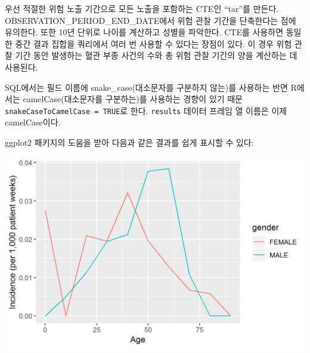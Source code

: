 \documentclass[10.5pt]{book}
\newenvironment{Shaded}{\begin{snugshade}}{\end{snugshade}}
\newcommand{\KeywordTok}[1]{\textcolor[rgb]{0.13,0.29,0.53}{\textbf{#1}}}
\newcommand{\DataTypeTok}[1]{\textcolor[rgb]{0.13,0.29,0.53}{#1}}
\newcommand{\DecValTok}[1]{\textcolor[rgb]{0.00,0.00,0.81}{#1}}
\newcommand{\StringTok}[1]{\textcolor[rgb]{0.31,0.60,0.02}{#1}}
\newcommand{\CommentTok}[1]{\textcolor[rgb]{0.56,0.35,0.01}{\textit{#1}}}
\newcommand{\OperatorTok}[1]{\textcolor[rgb]{0.81,0.36,0.00}{\textbf{#1}}}
\newcommand{\NormalTok}[1]{#1}
\theoremstyle{definition}
\theoremstyle{definition}
\theoremstyle{definition}
\theoremstyle{remark}
\begin{document}
우선 적절한 위험 노출 기간으로 모든 노출을 포함하는 CTE인 ``tar''를
만든다. OBSERVATION\_PERIOD\_END\_DATE에서 위험 관찰 기간을 단축한다는
점에 유의한다. 또한 10년 단위로 나이를 계산하고 성별을 파악한다. CTE를
사용하면 동일한 중간 결과 집합을 쿼리에서 여러 번 사용할 수 있다는
장점이 있다. 이 경우 위험 관찰 기간 동안 발생하는 혈관 부종 사건의 수와
총 위험 관찰 기간의 양을 계산하는 데 사용된다.

SQL에서는 필드 이름에 snake\_case(대소문자를 구분하지 않는)를 사용하는
반면 R에서는 camelCase(대소문자를 구분하는)를 사용하는 경향이 있기 때문
\texttt{snakeCaseToCamelCase\ =\ TRUE}로 한다. \texttt{results} 데이터
프레임 열 이름은 이제 camelCase이다.

ggplot2 패키지의 도움을 받아 다음과 같은 결과를 쉽게 표시할 수 있다:

\begin{Shaded}
\end{Shaded}

\begin{center}\includegraphics[width=0.8\linewidth]{images/SqlAndR/ir} \end{center}
\end{document}
